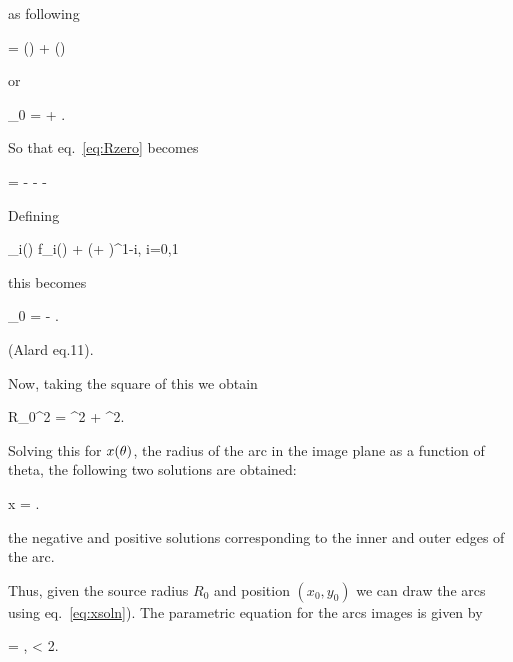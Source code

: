  as following

\beq
\vecrz = (\vecrz \cdot \hatth) \hatth + (\vecrz \cdot \hatr) \hatr
\eeq

or


\beq
\label{eq:rzero}
_{0} = \left[ \yone \,  \cos \te + \ytwo \,  \sin \te \right]  +
\left[ -\yone \,  \sin \te + \ytwo \,  \cos \te \right] \hat{\theta}.  \;\;\;
\eeq

So that eq.~\eqref{eq:Rzero} becomes

\beq
{} =  - 
 \hat{\theta} -  \left[ \yone \, 
\cos \te + \ytwo \,  \sin \te \right]  - \left[ -\yone \,  \sin \te +
\ytwo \,  \cos \te \right] \hat{\theta} \;\;\;
\eeq


Defining

\beq
{}_i(\theta) \equiv f_i(\theta) + (\yone \cos \te + \ytwo \sin
\te)\re^{1-i}, \;\; i=0,1
\eeq

this becomes

\beq
{}_{0} =  -
 
\hat{\theta}. \;\;\; \label{eq:Alard11}
\eeq

(Alard eq.11).

Now, taking the square of this we obtain

\beq
R_{0}^2 = ^2 +
^2. \;\;\;
\eeq

Solving this for $x(\theta)$, the radius of the arc in the image plane as
a function of theta, the following two solutions are obtained:

\beq
\label{eq:xsoln}
x = . \;\;\;
\eeq

the negative and positive solutions corresponding to the inner and outer edges
of the arc.

Thus, given the source radius $R_{0}$ and position $(x_0,y_0)$ we can
draw the arcs using eq.~\eqref{eq:xsoln}). The parametric equation for the
arcs images is given by

\beq
\label{eq:parametricarcs}
= ,  \leq \te <
2\pi.
\eeq


